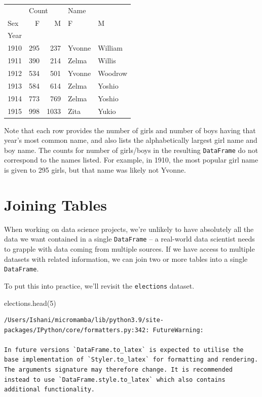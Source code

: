 \documentclass[
  letterpaper,
  DIV=11,
  numbers=noendperiod]{scrreprt}
\newenvironment{Shaded}{\begin{snugshade}}{\end{snugshade}}
\newcommand{\DecValTok}[1]{\textcolor[rgb]{0.68,0.00,0.00}{#1}}
\newcommand{\NormalTok}[1]{\textcolor[rgb]{0.00,0.23,0.31}{#1}}
\begin{document}
\begin{tabular}{lrrll}
\toprule
{} & \multicolumn{2}{l}{Count} & \multicolumn{2}{l}{Name} \\
Sex &     F &     M &       F &        M \\
Year &       &       &         &          \\
\midrule
1910 &   295 &   237 &  Yvonne &  William \\
1911 &   390 &   214 &   Zelma &   Willis \\
1912 &   534 &   501 &  Yvonne &  Woodrow \\
1913 &   584 &   614 &   Zelma &   Yoshio \\
1914 &   773 &   769 &   Zelma &   Yoshio \\
1915 &   998 &  1033 &    Zita &    Yukio \\
\bottomrule
\end{tabular}

Note that each row provides the number of girls and number of boys
having that year's most common name, and also lists the alphabetically
largest girl name and boy name. The counts for number of girls/boys in
the resulting \texttt{DataFrame} do not correspond to the names listed.
For example, in 1910, the most popular girl name is given to 295 girls,
but that name was likely not Yvonne.

\hypertarget{joining-tables}{%
\section{Joining Tables}\label{joining-tables}}

When working on data science projects, we're unlikely to have absolutely
all the data we want contained in a single \texttt{DataFrame} -- a
real-world data scientist needs to grapple with data coming from
multiple sources. If we have access to multiple datasets with related
information, we can join two or more tables into a single
\texttt{DataFrame}.

To put this into practice, we'll revisit the \texttt{elections} dataset.

\begin{Shaded}
\begin{Highlighting}[]
\NormalTok{elections.head(}\DecValTok{5}\NormalTok{)}
\end{Highlighting}
\end{Shaded}

\begin{verbatim}
/Users/Ishani/micromamba/lib/python3.9/site-packages/IPython/core/formatters.py:342: FutureWarning:

In future versions `DataFrame.to_latex` is expected to utilise the base implementation of `Styler.to_latex` for formatting and rendering. The arguments signature may therefore change. It is recommended instead to use `DataFrame.style.to_latex` which also contains additional functionality.
\end{verbatim}
\end{document}
